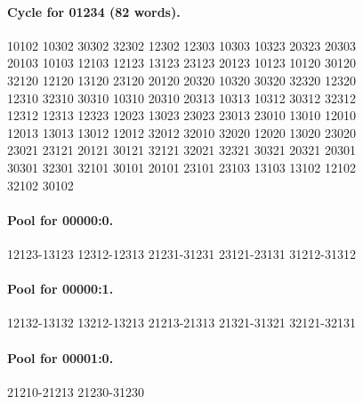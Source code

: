 \documentclass[11pt]{article}
\theoremstyle{remark}
\numberwithin{equation}{section}
\numberwithin{table}{section}
\begin{document}
\paragraph{Cycle for 01234 (82 words).}
\begingroup\footnotesize\ttfamily\begin{flushleft}
10102 10302 30302 32302 12302 12303 10303 10323 20323 20303\\
20103 10103 12103 12123 13123 23123 20123 10123 10120 30120\\
32120 12120 13120 23120 20120 20320 10320 30320 32320 12320\\
12310 32310 30310 10310 20310 20313 10313 10312 30312 32312\\
12312 12313 12323 12023 13023 23023 23013 23010 13010 12010\\
12013 13013 13012 12012 32012 32010 32020 12020 13020 23020\\
23021 23121 20121 30121 32121 32021 32321 30321 20321 20301\\
30301 32301 32101 30101 20101 23101 23103 13103 13102 12102\\
32102 30102\\
\end{flushleft}\endgroup
\paragraph{Pool for 00000:0.}
\begingroup\footnotesize\ttfamily\begin{flushleft}
12123-13123 12312-12313 21231-31231 23121-23131 31212-31312\\
\end{flushleft}\endgroup
\paragraph{Pool for 00000:1.}
\begingroup\footnotesize\ttfamily\begin{flushleft}
12132-13132 13212-13213 21213-21313 21321-31321 32121-32131\\
\end{flushleft}\endgroup
\paragraph{Pool for 00001:0.}
\begingroup\footnotesize\ttfamily\begin{flushleft}
21210-21213 21230-31230\\
\end{flushleft}\endgroup
\end{document}
